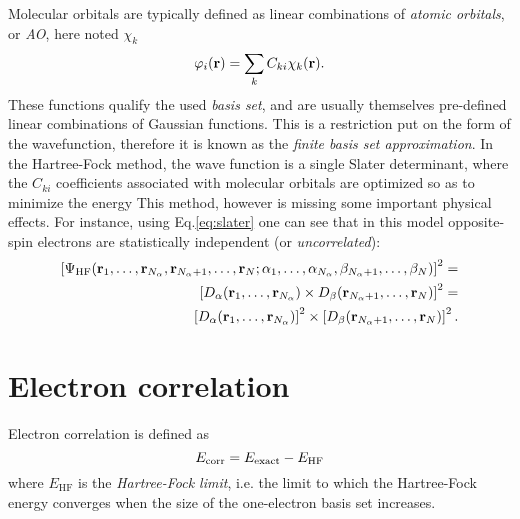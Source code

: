 \documentclass[./thesis.tex]{subfiles}
\begin{document}
Molecular orbitals are typically defined as linear combinations of \emph{atomic orbitals}, or \emph{AO}, here noted $\chi_k$
\begin{equation}
 \varphi_i({\bf r}) = \sum_k C_{ki} \chi_k({\bf r}).
\label{eq:def_mo}
\end{equation}
These functions qualify the used \emph{basis set}, and are usually themselves pre-defined linear combinations of Gaussian functions. This is a restriction put on the form of the wavefunction, therefore it is known as the \emph{finite basis set approximation}.
In the Hartree-Fock method, the wave function is a single Slater determinant, where the $C_{ki}$ coefficients associated with molecular orbitals are optimized so as to minimize the energy
This method, however is missing some important physical effects. For instance, using Eq.\eqref{eq:slater} one can see that in this model opposite-spin electrons are statistically independent (or \emph{uncorrelated}):
\begin{equation}
\begin{split}
\left[ \Psi_\textrm{HF}({\bf r}_1,\dots,{\bf r}_{{N_\alpha}},{\bf r}_{{N_\alpha}+1},\dots,{\bf r}_N;
      \alpha_1,\dots,\alpha_{{N_\alpha}},\beta_{{N_\alpha}+1},\dots,\beta_N) \right]^2 = \\
\left[ D_\alpha({\bf r}_1,\dots,{\bf r}_{{N_\alpha}}) \times D_\beta({\bf r}_{{N_\alpha}+1},\dots,{\bf r}_N) \right]^2 = \\
\left[ D_\alpha({\bf r}_1,\dots,{\bf r}_{{N_\alpha}}) \right]^2 \times \left[ D_\beta({\bf r}_{{N_\alpha}+1},\dots,{\bf r}_N) \right]^2.
\end{split}
\end{equation}

\section{Electron correlation}

Electron correlation is defined as\cite{Lowdin_1959}
\begin{equation}
E_\text{corr} = E_\text{exact} - E_\text{HF}
\end{equation}
where $E_\text{HF}$ is the \emph{Hartree-Fock limit}, i.e. the limit to which the Hartree-Fock energy converges when the size of the one-electron basis set increases.
\end{document}
